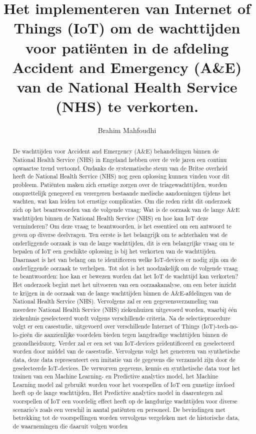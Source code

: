 \documentclass{hogent-article}
\title{Het implementeren van Internet of Things (IoT) om de wachttijden voor patiënten in de afdeling Accident and Emergency (A\&E) van de National Health Service (NHS) te verkorten.}
\author{Brahim Mahfoudhi}
\begin{document}
\begin{abstract}
De wachttijden voor Accident and Emergency (A\&E) behandelingen binnen de National Health Service (NHS) in Engeland hebben over de vele jaren een continu opwaartse trend vertoond. Ondanks de systematische steun van de Britse overheid heeft de National Health Service (NHS) nog geen oplossing kunnen vinden voor dit probleem. Patiënten maken zich ernstige zorgen over de triagewachttijden, worden onopzettelijk genegeerd en verergeren bestaande medische aandoeningen tijdens het wachten, wat kan leiden tot ernstige complicaties. Om die reden richt dit onderzoek zich op het beantwoorden van de volgende vraag: Wat is de oorzaak van de lange A\&E wachttijden binnen de National Health Service (NHS) en hoe kan IoT deze verminderen? Om deze vraag te beantwoorden, is het essentieel om een antwoord te geven op diverse deelvragen. Ten eerste is het belangrijk om te achterhalen wat de onderliggende oorzaak is van de lange wachttijden, dit is een belangrijke vraag om te bepalen of IoT een geschikte oplossing is bij het verkorten van de wachttijden. Daarnaast is het van belang om te identificeren welke IoT-devices er nodig zijn om de onderliggende oorzaak te verhelpen. Tot slot is het noodzakelijk om de volgende vraag te beantwoorden: hoe kan er bewezen worden dat het IoT de wachttijd kan verkorten? Het onderzoek begint met het uitvoeren van een oorzaakanalyse, om een beter inzicht te krijgen in de oorzaak van de lange wachttijden binnen de A\&E-afdelingen van de National Health Service (NHS). Vervolgens zal er een gegevensverzameling van meerdere National Health Service (NHS) ziekenhuizen uitgevoerd worden, waarbij één ziekenhuis geselecteerd wordt volgens verschillende criteria. Na de selectieprocedure volgt er een casestudie, uitgevoerd over verschillende Internet of Things (IoT)-tech-no-lo-gieën die aanzienlijke voordelen bieden tegen langdradige wachttijden binnen de gezondheidszorg. Verder zal er een set van IoT-devices geïdentificeerd en geselecteerd worden door middel van de casestudie. Vervolgens volgt het genereren van synthetische data, deze data representeert een imitatie van de gegevens die verzameld zijn door de geselecteerde IoT-devices. De verworven gegevens, kennis en synthetische data voor het trainen van een Machine Learning- en Predictive analytics model, het Machine Learning model zal gebruikt worden voor het voorspellen of IoT een gunstige invloed heeft op de lange wachttijden, Het Predictive analytics model in daarentegen zal voorspellen of IoT een voordelig effect heeft op de langdurige wachttijden voor diverse scenario’s zoals een verschil in aantal patiënten en personeel. De bevindingen met betrekking tot de voorspellingen worden vervolgens vergeleken met de historische data, de waarnemingen die daaruit volgen worden 
\end{abstract}
\end{document}

